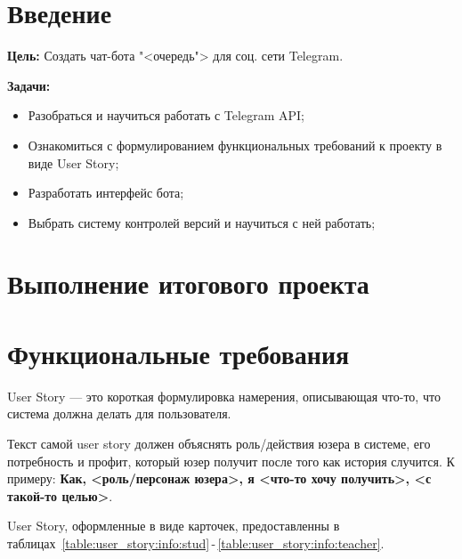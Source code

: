 \graphicspath{{./img/}} %

\section*{\LARGE{Введение}}
\textbf{Цель:} Создать чат-бота "<очередь"> для соц. сети Telegram.

\textbf{Задачи:}
\begin{itemize}
	\item Разобраться и научиться работать с Telegram API;
	\item Ознакомиться с формулированием функциональных требований к проекту
		в виде User Story;
	\item Разработать интерфейс бота;
	\item Выбрать систему контролей версий и научиться с ней работать;
\end{itemize}

\clearpage

\section*{\LARGE{Выполнение итогового проекта}}

\section{Функциональные требования}
User Story --- это короткая формулировка намерения, описывающая что-то,
что система должна делать для пользователя.\par
Текст самой user story должен объяснять роль/действия юзера в системе,
его потребность и профит, который юзер получит после того как история
случится. К примеру: \textbf{Как, <роль/персонаж юзера>, я <что-то хочу
получить>, <с такой-то целью>}.

User Story, оформленные в виде карточек, предоставленны в
таблицах~\ref{table:user_story:info:stud}\,-\,\ref{table:user_story:info:teacher}.

